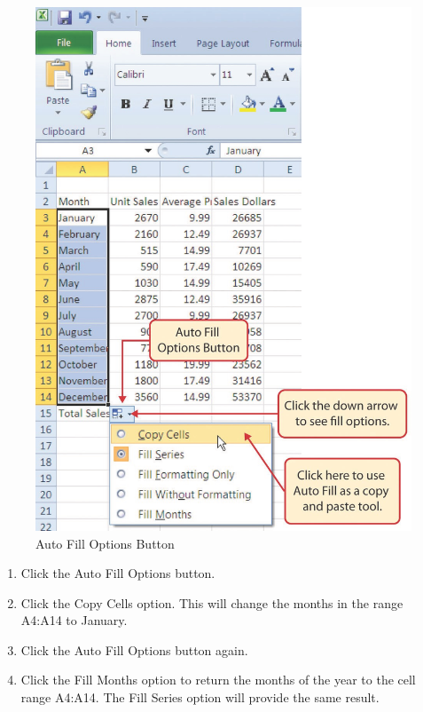 \begin{figure}[H]
	\centering
	\includegraphics[width=\maxwidth{.95\linewidth}]{gfx/ch01_fig20}
	\caption{Auto Fill Options Button}
	\label{01:fig20}
\end{figure}

\begin{enumerate}
	\item Click the Auto Fill Options button.
	\item Click the Copy Cells option. This will change the months in the range \textsf{A4:A14} to January.
	\item Click the Auto Fill Options button again.
	\item Click the Fill Months option to return the months of the year to the cell range \textsf{A4:A14}. The Fill Series option will provide the same result.
\end{enumerate}

